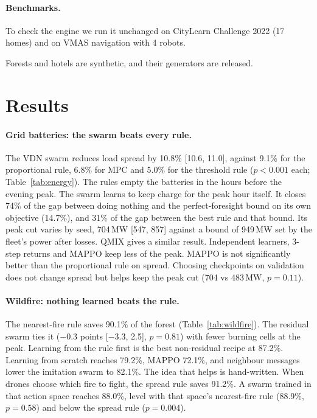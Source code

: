 \documentclass[11pt]{article}
\begin{document}
\paragraph{Benchmarks.} To check the engine we run it unchanged on CityLearn Challenge 2022 (17 homes) and on VMAS navigation \citep{bettini2022vmas} with 4 robots.

Forests and hotels are synthetic, and their generators are released.

\section{Results}\label{sec:results}





\paragraph{Grid batteries: the swarm beats every rule.} The VDN swarm reduces load spread by 10.8\% [10.6, 11.0], against 9.1\% for the proportional rule, 6.8\% for MPC and 5.0\% for the threshold rule ($p<0.001$ each; Table~\ref{tab:energy}). The rules empty the batteries in the hours before the evening peak. The swarm learns to keep charge for the peak hour itself. It closes 74\% of the gap between doing nothing and the perfect-foresight bound on its own objective (14.7\%), and 31\% of the gap between the best rule and that bound. Its peak cut varies by seed, 704\,MW [547, 857] against a bound of 949\,MW set by the fleet's power after losses. QMIX gives a similar result. Independent learners, 3-step returns and MAPPO keep less of the peak. MAPPO is not significantly better than the proportional rule on spread. Choosing checkpoints on validation does not change spread but helps keep the peak cut (704 vs 483\,MW, $p=0.11$).

\paragraph{Wildfire: nothing learned beats the rule.} The nearest-fire rule saves 90.1\% of the forest (Table~\ref{tab:wildfire}). The residual swarm ties it ($-0.3$ points [$-3.3$, 2.5], $p=0.81$) with fewer burning cells at the peak. Learning from the rule first is the best non-residual recipe at 87.2\%. Learning from scratch reaches 79.2\%, MAPPO 72.1\%, and neighbour messages lower the imitation swarm to 82.1\%. The idea that helps is hand-written. When drones choose which fire to fight, the spread rule saves 91.2\%. A swarm trained in that action space reaches 88.0\%, level with that space's nearest-fire rule (88.9\%, $p=0.58$) and below the spread rule ($p=0.004$).
\end{document}

